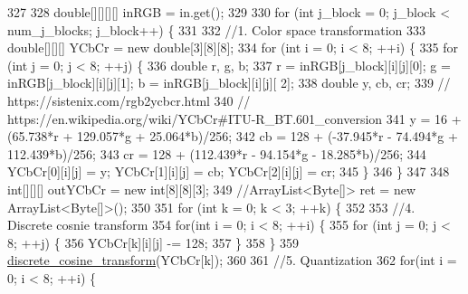 \begin{DoxyCode}
327 
328             \textcolor{keywordtype}{double}[][][][] inRGB = in.get();
329 
330             \textcolor{keywordflow}{for} (\textcolor{keywordtype}{int} j\_block = 0; j\_block < num\_j\_blocks; j\_block++)  \{
331                 
332                 \textcolor{comment}{//1. Color space transformation}
333                 \textcolor{keywordtype}{double}[][][] YCbCr = \textcolor{keyword}{new} \textcolor{keywordtype}{double}[3][8][8];
334                 \textcolor{keywordflow}{for} (\textcolor{keywordtype}{int} i = 0; i < 8; ++i) \{
335                     \textcolor{keywordflow}{for} (\textcolor{keywordtype}{int} j = 0; j < 8; ++j) \{
336                         \textcolor{keywordtype}{double} r, g, b;
337                         r = inRGB[j\_block][i][j][0]; g = inRGB[j\_block][i][j][1]; b = inRGB[j\_block][i][j][
      2];
338                         \textcolor{keywordtype}{double} y, cb, cr;
339                         \textcolor{comment}{// https://sistenix.com/rgb2ycbcr.html}
340                         \textcolor{comment}{// https://en.wikipedia.org/wiki/YCbCr#ITU-R\_BT.601\_conversion}
341                         y = 16 + (65.738*r + 129.057*g + 25.064*b)/256;
342                         cb = 128 + (-37.945*r - 74.494*g + 112.439*b)/256;
343                         cr = 128 + (112.439*r - 94.154*g - 18.285*b)/256;
344                         YCbCr[0][i][j] = y; YCbCr[1][i][j] = cb; YCbCr[2][i][j] = cr;
345                     \}
346                 \}
347                 
348                 \textcolor{keywordtype}{int}[][][] outYCbCr = \textcolor{keyword}{new} \textcolor{keywordtype}{int}[8][8][3];
349                 \textcolor{comment}{//ArrayList<Byte[]> ret = new ArrayList<Byte[]>();}
350                         
351                 \textcolor{keywordflow}{for} (\textcolor{keywordtype}{int} k = 0; k < 3; ++k) \{
352                     
353                     \textcolor{comment}{//4. Discrete cosnie transform}
354                     \textcolor{keywordflow}{for}(\textcolor{keywordtype}{int} i = 0; i < 8; ++i) \{
355                         \textcolor{keywordflow}{for} (\textcolor{keywordtype}{int} j = 0; j < 8; ++j) \{
356                             YCbCr[k][i][j] -= 128;
357                         \}
358                     \}
359                     \hyperlink{classdomini_1_1algorithm_1_1JPEG_a367e6d1e6543bf3d8c847aae36f4b6bf}{discrete\_cosine\_transform}(YCbCr[k]);
360                     
361                     \textcolor{comment}{//5. Quantization}
362                     \textcolor{keywordflow}{for}(\textcolor{keywordtype}{int} i = 0; i < 8; ++i) \{

\end{DoxyCode}
